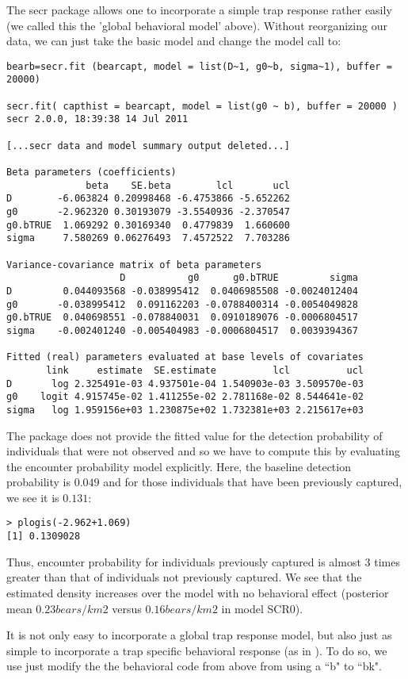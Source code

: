 The secr package allows one to incorporate a simple trap response
rather easily (we called this the 'global behavioral model' above). 
Without reorganizing our data, we can just take
the basic model and change the model call to:
{\small
\begin{verbatim}
bearb=secr.fit (bearcapt, model = list(D~1, g0~b, sigma~1), buffer = 20000)

secr.fit( capthist = bearcapt, model = list(g0 ~ b), buffer = 20000 )
secr 2.0.0, 18:39:38 14 Jul 2011

[...secr data and model summary output deleted...]

Beta parameters (coefficients) 
              beta    SE.beta        lcl       ucl
D        -6.063824 0.20998468 -6.4753866 -5.652262
g0       -2.962320 0.30193079 -3.5540936 -2.370547
g0.bTRUE  1.069292 0.30169340  0.4779839  1.660600
sigma     7.580269 0.06276493  7.4572522  7.703286

Variance-covariance matrix of beta parameters 
                    D           g0      g0.bTRUE         sigma
D         0.044093568 -0.038995412  0.0406985508 -0.0024012404
g0       -0.038995412  0.091162203 -0.0788400314 -0.0054049828
g0.bTRUE  0.040698551 -0.078840031  0.0910189076 -0.0006804517
sigma    -0.002401240 -0.005404983 -0.0006804517  0.0039394367

Fitted (real) parameters evaluated at base levels of covariates 
       link     estimate  SE.estimate          lcl          ucl
D       log 2.325491e-03 4.937501e-04 1.540903e-03 3.509570e-03
g0    logit 4.915745e-02 1.411255e-02 2.781168e-02 8.544641e-02
sigma   log 1.959156e+03 1.230875e+02 1.732381e+03 2.215617e+03
\end{verbatim}
} 
The package \secr does not provide the fitted value for the detection
probability of individuals that were not observed and so we have to
compute this by evaluating the encounter probability model explicitly.
Here, the baseline
detection probability is $0.049$ and for those individuals that have
been previously captured, we see it is $0.131$:
\begin{verbatim}
> plogis(-2.962+1.069)
[1] 0.1309028
\end{verbatim}
Thus, encounter probability for individuals previously captured is
almost 3 times greater than that of individuals 
not previously captured.  We see that the 
estimated density increases over the model with no behavioral effect
(posterior mean $0.23
bears/km2$ versus $0.16 bears/km2$ in model SCR0).

It is not only easy to incorporate a global trap response model, but also just as simple to
incorporate a trap specific behavioral response (as in
\citet{royle_etal:2009}).  To do so, we use just modify the
the behavioral code from above from using a ``b" to ``bk".

